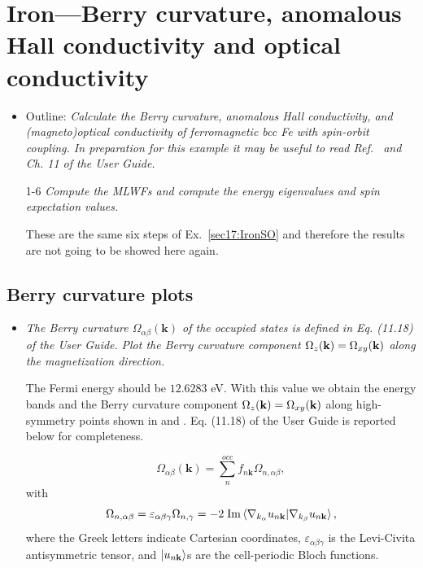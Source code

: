 \section{Iron---Berry curvature, anomalous Hall conductivity and optical conductivity}
\label{sec18:IronBerry}

\begin{itemize}
	\item Outline: {\it Calculate the Berry curvature, anomalous Hall conductivity, and (magneto)optical conductivity of ferromagnetic bcc Fe with spin-orbit coupling. In preparation for this example it may be useful to read Ref.~ and Ch. 11 of the User Guide.}
\end{itemize}

\begin{itemize}
	\item[1-6] {\it Compute the MLWFs and compute the energy eigenvalues and spin expectation values.}

	These are the same six steps of Ex.~\ref{sec17:IronSO} and therefore the results are not going to be showed here again.
\end{itemize}

\subsection*{Berry curvature plots}
\begin{itemize}
	\item {\it The Berry curvature $\Omega_{\alpha\beta}(\mathbf{k})$ of the occupied states is defined in Eq. (11.18) of the User Guide.}
	{\it Plot the Berry curvature component $\Omega_z(\bfk) = \Omega_{xy}(\bfk)$ along the magnetization direction.}

	The Fermi energy should be $12.6283$ eV. With this value we obtain the energy bands and the Berry curvature component $\Omega_z(\bfk) = \Omega_{xy}(\bfk)$ along high-symmetry points shown in  and . Eq. (11.18) of the User Guide is reported below for completeness.

\begin{equation}
\Omega_{\alpha\beta}(\mathbf{k}) = \sum_{n}^{occ} f_{n\mathbf{k}}\Omega_{n,\alpha\beta},
\end{equation}
with
\begin{equation}
\Omega_{n,\alpha\beta} = \varepsilon_{\alpha\beta\gamma}\Omega_{n,\gamma} = -2\;\mathrm{Im}\braket{\nabla_{k_\alpha}\unk \vert \nabla_{k_\beta}\unk},
\end{equation}
where the Greek letters indicate Cartesian coordinates, $\varepsilon_{\alpha\beta\gamma}$ is the Levi-Civita antisymmetric tensor, and $\ket{u_{n\bfk}}$s
are the cell-periodic Bloch functions.
\end{itemize}

